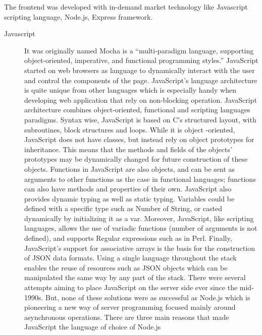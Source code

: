 The frontend was developed with in-demand market technology like Javascript scripting language, Node.js, Express framework.

\begin{description}
    \item[Javascript] It was originally named Mocha is a “multi-paradigm language, supporting object-oriented, imperative, and functional programming styles.” \cite{javascript} JavaScript started on web browsers as language to dynamically interact with the user and control the components of the page. JavaScript’s language architecture is quite unique from other languages which is especially handy when developing web application that rely on non-blocking operation.
    \newline
    \newline
    JavaScript architecture combines object-oriented, functional and scripting languages paradigms. Syntax wise, JavaScript is based on C’s structured layout, with subroutines, block structures and loops. While it is object
    -oriented, JavaScript does not have classes, but instead
    rely on object prototypes for inheritance. This means that the methods and fields of the objects’ prototypes may be dynamically changed for future construction of these objects. Functions in JavaScript are also objects, and can be sent as arguments to other functions as the case in
    functional languages; functions can also have methods and properties of their own. JavaScript also provides dynamic typing as well as static typing. Variables could be defined with a specific type such as Number of String, or casted dynamically by initializing it as a var. Moreover, JavaScript, like scripting languages, allows the use of variadic functions (number of arguments is not defined), and supports Regular expressions such as in Perl. Finally, JavaScript’s support for associative arrays is the basis for the construction of JSON data formats. Using a single language throughout the stack enables the reuse of resources such as JSON objects which can be manipulated the same way by any part of the stack.
    \newline
    \newline
    There were several attempts aiming to place JavaScript on the server side ever since the mid-1990s. But, none of these solutions were as successful as Node.js which is pioneering a new way of server programming focused mainly around asynchronous operations. There are three
    main reasons that made JavaScript the language of choice of Node.js
    \begin{enumerate}

\end{enumerate}
\end{description}

